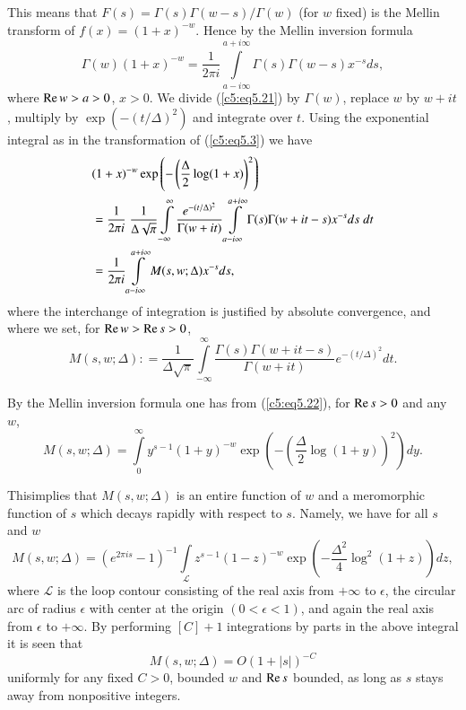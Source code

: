This means that $F(s) = \Gamma (s) \Gamma (w-s) / \Gamma (w)$ (for $w$
fixed) is the Mellin transform of $f(x) = (1+x)^{-w}$. Hence by the
Mellin inversion formula 
\begin{equation}
\Gamma(w) (1+x)^{-w} = \frac{1}{2\pi i} \int\limits^{a+ i
  \infty}_{a-i\infty} \Gamma(s) \Gamma (w-s) x^{-s}
ds,\label{c5:eq5.21} 
\end{equation}
where $\operatorname{Re} w > a > 0$, $x > 0$. We divide (\ref{c5:eq5.21}) by $\Gamma(w)$, replace $w$ by $w+ it$, multiply by $\exp (-(t/\Delta)^2)$ and integrate over $t$. Using the exponential integral as in the transformation of (\ref{c5:eq5.3}) we have
\begin{align}
& (1+x)^{-w} \exp \left(- \left(\frac{\Delta}{2} \log (1+x) \right)^2 \right)\label{c5:eq5.22}\\
& = \frac{1}{2\pi i} \; \frac{1}{\Delta \sqrt{\pi}}
  \int\limits^{\infty}_{-\infty}
  \frac{e^{-(t/\Delta)^2}}{\Gamma(w+it)}
  \int\limits^{a+i\infty}_{a-i\infty} \Gamma(s) \Gamma (w+it-s) x^{-s}
  ds \; dt\notag\\ 
& = \frac{1}{2\pi i} \int\limits^{a+i\infty}_{a-i\infty} M(s, w;
  \Delta) x^{-s} ds,\notag 
\end{align}
where the interchange of integration is justified by absolute
convergence, and where we set, for $\operatorname{Re} w > \operatorname{Re} s > 0$, 
\begin{equation}
M(s, w;\Delta) : = \frac{1}{\Delta \sqrt{\pi}}
\int\limits^{\infty}_{-\infty} \frac{\Gamma(s) \Gamma (w+
  it-s)}{\Gamma(w+it)} e^{-(t/\Delta)^2}
dt.\label{c5:eq5.23} 
\end{equation}

By the Mellin inversion formula one has from (\ref{c5:eq5.22}), for
$\operatorname{Re} s > 0$ and any $w$, 
\begin{equation} 
M(s,w;\Delta) = \int\limits^{\infty}_0 y^{s-1} (1 + y)^{-w} \exp
\left(- \left(\frac{\Delta}{2} \log (1+y) \right)^2 \right)
dy.\label{c5:eq5.24} 
\end{equation}

This\pageoriginale implies that $M(s,w;\Delta)$ is an entire function
of $w$ and a meromorphic function of $s$ which decays rapidly with
respect to $s$. Namely, we have for all $s$ and $w$ 
$$
M(s,w;\Delta) = (e^{2\pi i s} -1)^{-1} \int\limits_{\mathscr{L}}
z^{s-1} (1-z)^{-w} \exp \left(-\frac{\Delta^2}{4} \log^2 (1+z) \right)
dz, 
$$
where $\mathscr{L}$ is the loop contour consisting of the real axis
from $+\infty$ to $\epsilon$, the circular arc of radius $\epsilon$
with center at the origin $(0<\epsilon<1)$, and again the real axis
from $\epsilon$ to $+\infty$. By performing $[C]+1$ integrations by
parts in the above integral it is seen that  
$$
M(s,w;\Delta) = O (1+|s|)^{-C}
$$
uniformly for any fixed $C>0$, bounded $w$ and $\operatorname{Re} s$ bounded, as
long as $s$ stays away from nonpositive integers. 

